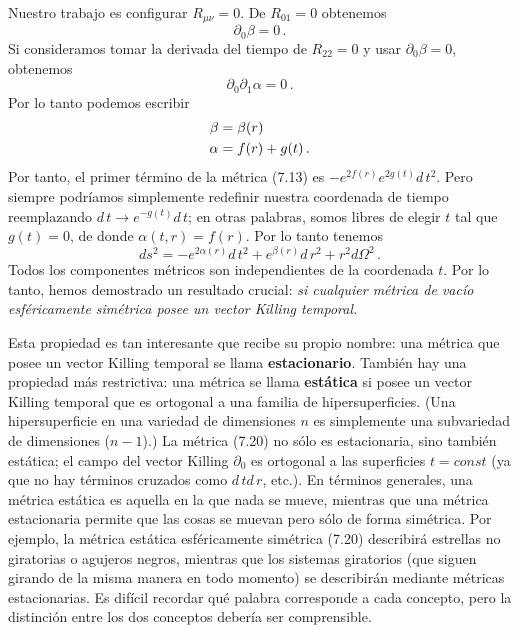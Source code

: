 \documentclass[11pt,b5paper,openany,twoside]{book}
\newcommand{\mn}{{\mu\nu}}
\newcommand{\p}[1]{{\partial_{#1}}}
\begin{document}
Nuestro trabajo es configurar $R_\mn=0$.
De $R_{01}=0$ obtenemos
\begin{equation}
\p0\beta = 0\,.\label{7.17}
\end{equation}
Si consideramos tomar la derivada del tiempo de $R_{22}=0$ y usar $\p0\beta = 0$, obtenemos
\begin{equation}
\p0\p1\alpha =0\,.\label{7.18}
\end{equation}
Por lo tanto podemos escribir
\begin{align}
\beta  &=  \beta(r) \notag \\
\alpha  &=  f(r)+g(t)\,.\label{7.19}
\end{align}
Por tanto, el primer término de la métrica (7.13) es $-e^{2f(r)}e^{2g(t)}  d\,t^2$.
Pero siempre podríamos simplemente redefinir nuestra coordenada de tiempo reemplazando $ d\,t\rightarrow e^{-g(t)} d\,t$; en otras palabras, somos libres de elegir $t$ tal que $g(t)=0$, de donde $\alpha(t,r)=f(r)$.
Por lo tanto tenemos
\begin{equation}
ds^2 = -e^{2\alpha(r)} d\,t^2 + e^{\beta(r)} d\,r^2
+ r^2 d\Omega^2\,.\label{7.20}
\end{equation}
Todos los componentes métricos son independientes de la coordenada $t$.
Por lo tanto, hemos demostrado un resultado crucial: \textit{si cualquier métrica de vacío esféricamente simétrica posee un vector Killing temporal.}

Esta propiedad es tan interesante que recibe su propio nombre: una métrica que posee un vector Killing temporal se llama {\bf estacionario}.
También hay una propiedad más restrictiva: una métrica se llama {\bf estática} si posee un vector Killing temporal que es ortogonal a una familia de hipersuperficies.
(Una hipersuperficie en una variedad de dimensiones $n$ es simplemente una subvariedad de dimensiones ($n-1$).)
La métrica (7.20) no sólo es estacionaria, sino también estática; el campo del vector Killing $\p0$ es ortogonal a las superficies $t=const$ (ya que no hay términos cruzados como $ d\,t d\,r$, etc.).
En términos generales, una métrica estática es aquella en la que nada se mueve, mientras que una métrica estacionaria permite que las cosas se muevan pero sólo de forma simétrica.
Por ejemplo, la métrica estática esféricamente simétrica (7.20) describirá estrellas no giratorias o agujeros negros, mientras que los sistemas giratorios (que siguen girando de la misma manera en todo momento) se describirán mediante métricas estacionarias.
Es difícil recordar qué palabra corresponde a cada concepto, pero la distinción entre los dos conceptos debería ser comprensible.
\end{document}
